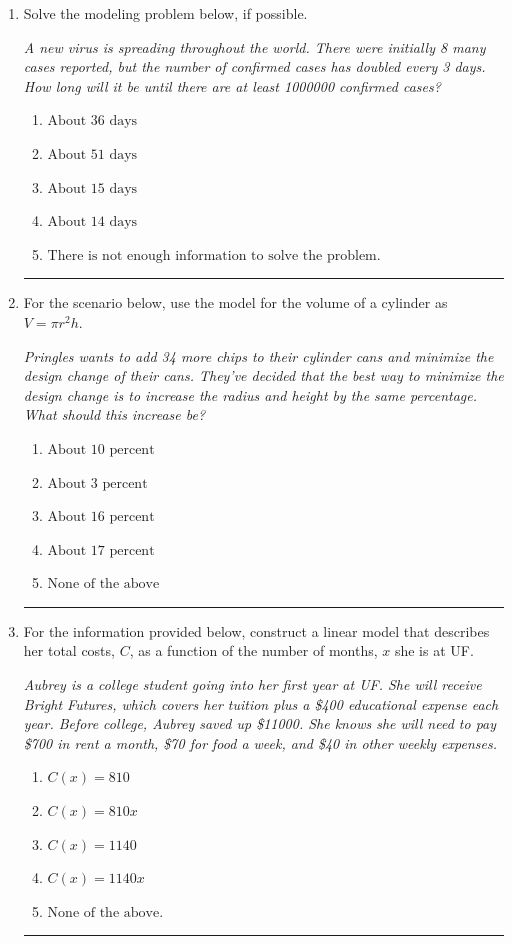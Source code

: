 \documentclass[14pt]{extbook}
\newcommand{\litem}[1]{\item#1\hspace*{-1cm}\rule{\textwidth}{0.4pt}}
\begin{document}
\begin{enumerate}
{\begin{enumerate}[label=\Alph*.]
\end{enumerate} }
\litem{
Solve the modeling problem below, if possible.
\begin{center}
    \textit{ A new virus is spreading throughout the world. There were initially 8 many cases reported, but the number of confirmed cases has doubled every 3 days. How long will it be until there are at least 1000000 confirmed cases? }
\end{center}
\begin{enumerate}[label=\Alph*.]
\item \( \text{About } 36 \text{ days} \)
\item \( \text{About } 51 \text{ days} \)
\item \( \text{About } 15 \text{ days} \)
\item \( \text{About } 14 \text{ days} \)
\item \( \text{There is not enough information to solve the problem.} \)

\end{enumerate} }
\litem{
For the scenario below, use the model for the volume of a cylinder as $V = \pi r^2 h$.
\begin{center}
    \textit{ Pringles wants to add 34 \text{percent} more chips to their cylinder cans and minimize the design change of their cans. They've decided that the best way to minimize the design change is to increase the radius and height by the same percentage. What should this increase be? }
\end{center}
\begin{enumerate}[label=\Alph*.]
\item \( \text{About } 10 \text{ percent} \)
\item \( \text{About } 3 \text{ percent} \)
\item \( \text{About } 16 \text{ percent} \)
\item \( \text{About } 17 \text{ percent} \)
\item \( \text{None of the above} \)

\end{enumerate} }
\litem{
For the information provided below, construct a linear model that describes her total costs, $C$, as a function of the number of months, $x$ she is at UF. 
\begin{center}
    \textit{ Aubrey is a college student going into her first year at UF. She will receive Bright Futures, which covers her tuition plus a \$400 educational expense each year. Before college, Aubrey saved up \$11000. She knows she will need to pay \$700 in rent a month, \$70 for food a week, and \$40 in other weekly expenses. }
\end{center}
\begin{enumerate}[label=\Alph*.]
\item \( C(x) = 810 \)
\item \( C(x) = 810 x \)
\item \( C(x) = 1140 \)
\item \( C(x) = 1140 x \)
\item \( \text{None of the above.} \)


\end{enumerate}}
\end{enumerate}
\end{document}
